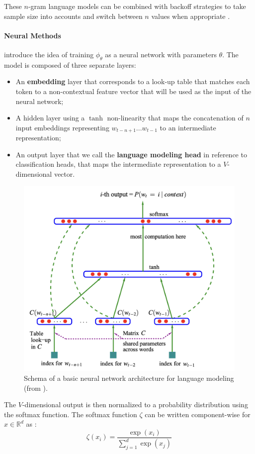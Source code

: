 These $n$-gram language models can be combined with backoff strategies to take sample size into accounts and switch between $n$ values when appropriate \citep{kneser_ney}.

\paragraph*{Neural Methods}
\citet{bengio2000neural} introduce the idea of training $\phi_\theta$ as a neural network with parameters $\theta$. The model is composed of three separate layers:

\begin{itemize}
    \item An \textbf{embedding} layer that corresponds to a look-up table that matches each token to a non-contextual feature vector that will be used as the input of the neural network;
    \item A hidden layer using a $\tanh$ non-linearity that maps the concatenation of $n$ input embeddings representing $w_{t-n+1}...w_{t-1}$ to an intermediate representation;
    \item An output layer that we call the \textbf{language modeling head} in reference to classification heads, that maps the intermediate representation to a $V$-dimensional vector.
\end{itemize}

\begin{figure}[h]
    \centering
    \includegraphics[width=0.5\linewidth]{sources/related_works/imgs/bengio_schema.png}
    \caption{Schema of a basic neural network architecture for language modeling (from \citet{bengio2000neural}).}
    \label{fig:bengio}
\end{figure}

The $V$-dimensional output is then normalized to a probability distribution using the softmax function. The softmax function $\zeta$ can be written component-wise for $x \in \mathbb{R}^d$ as :
$$
\zeta(x_i) = \frac{\exp(x_i)}{\sum_{j=1}^{d} \exp(x_j)}
$$

